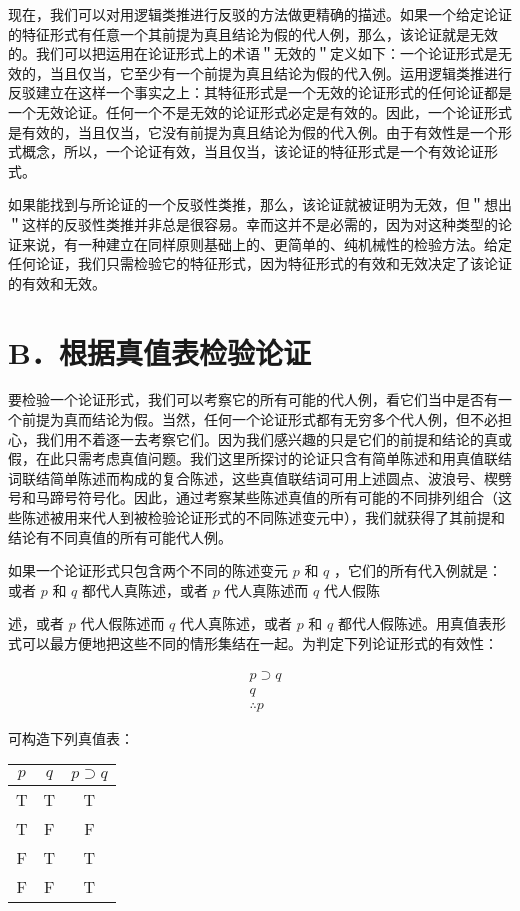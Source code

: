 现在，我们可以对用逻辑类推进行反驳的方法做更精确的描述。如果一个给定论证的特征形式有任意一个其前提为真且结论为假的代人例，那么，该论证就是无效的。我们可以把运用在论证形式上的术语＂无效的＂定义如下：一个论证形式是无效的，当且仅当，它至少有一个前提为真且结论为假的代入例。运用逻辑类推进行反驳建立在这样一个事实之上：其特征形式是一个无效的论证形式的任何论证都是一个无效论证。任何一个不是无效的论证形式必定是有效的。因此，一个论证形式是有效的，当且仅当，它没有前提为真且结论为假的代入例。由于有效性是一个形式概念，所以，一个论证有效，当且仅当，该论证的特征形式是一个有效论证形式。

如果能找到与所论证的一个反驳性类推，那么，该论证就被证明为无效，但＂想出＂这样的反驳性类推并非总是很容易。幸而这并不是必需的，因为对这种类型的论证来说，有一种建立在同样原则基础上的、更简单的、纯机械性的检验方法。给定任何论证，我们只需检验它的特征形式，因为特征形式的有效和无效决定了该论证的有效和无效。

\section*{B．根据真值表检验论证}
要检验一个论证形式，我们可以考察它的所有可能的代人例，看它们当中是否有一个前提为真而结论为假。当然，任何一个论证形式都有无穷多个代人例，但不必担心，我们用不着逐一去考察它们。因为我们感兴趣的只是它们的前提和结论的真或假，在此只需考虑真值问题。我们这里所探讨的论证只含有简单陈述和用真值联结词联结简单陈述而构成的复合陈述，这些真值联结词可用上述圆点、波浪号、楔劈号和马蹄号符号化。因此，通过考察某些陈述真值的所有可能的不同排列组合（这些陈述被用来代人到被检验论证形式的不同陈述变元中），我们就获得了其前提和结论有不同真值的所有可能代人例。

如果一个论证形式只包含两个不同的陈述变元 $p$ 和 $q$ ，它们的所有代入例就是：或者 $p$ 和 $q$ 都代人真陈述，或者 $p$ 代人真陈述而 $q$ 代人假陈

述，或者 $p$ 代人假陈述而 $q$ 代人真陈述，或者 $p$ 和 $q$ 都代人假陈述。用真值表形式可以最方便地把这些不同的情形集结在一起。为判定下列论证形式的有效性：

$$
\begin{aligned}
& p \supset q \\
& q \\
& \therefore p
\end{aligned}
$$

可构造下列真值表：

\begin{center}
\begin{tabular}{|ccc|}
\hline
$p$ & $q$ & $p \supset q$ \\
\hline
T & T & T \\
T & F & F \\
F & T & T \\
F & F & T \\
\hline
\end{tabular}
\end{center}


